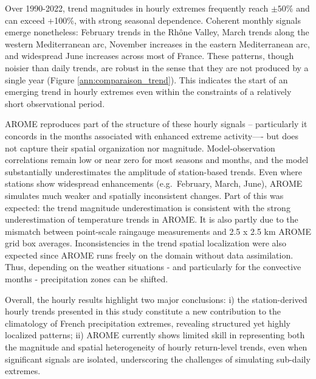 \documentclass[hess, manuscript]{copernicus}
\begin{document}
Over 1990-2022, trend magnitudes in hourly extremes frequently reach $\pm 50\%$ and can exceed +100\%, with strong seasonal dependence. Coherent monthly signals emerge nonetheless: February trends in the Rhône Valley, March trends along the western Mediterranean arc, November increases in the eastern Mediterranean arc, and widespread June increases across most of France. These patterns, though noisier than daily trends, are robust in the sense that they are not produced by a single year (Figure \ref{ann:comparaison_trend}). This indicates the start of an emerging trend in hourly extremes even within the constraints of a relatively short observational period.

AROME reproduces part of the structure of these hourly signals -- particularly it concords in the months associated with enhanced extreme activity---- but does not capture their spatial organization nor magnitude. Model-observation correlations remain low or near zero for most seasons and months, and the model substantially underestimates the amplitude of station-based trends. Even where stations show widespread enhancements (e.g.\ February, March, June), AROME simulates much weaker and spatially inconsistent changes. Part of this was expected: the trend magnitude underestimation is consistent with the strong underestimation of temperature trends in AROME. It is also partly due to the mismatch between point-scale raingauge measurements and 2.5 x 2.5 km AROME grid box averages. Inconsistencies in the trend spatial localization were also expected since AROME runs freely on the domain without data assimilation. Thus, depending on the weather situations - and particularly for the convective months - precipitation zones can be shifted. 

Overall, the hourly results highlight two major conclusions: i) the station-derived hourly trends presented in this study constitute a new contribution to the climatology of French precipitation extremes, revealing structured yet highly localized patterns; ii) AROME currently shows limited skill in representing both the magnitude and spatial heterogeneity of hourly return-level trends, even when significant signals are isolated, underscoring the challenges of simulating sub-daily extremes.
\end{document}

